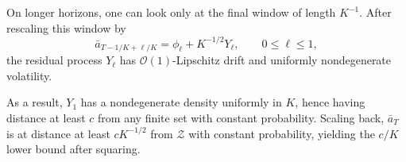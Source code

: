 \documentclass{article}
\newcommand{\1}{\mathbbm{1}}
\numberwithin{equation}{section}
\begin{document}
On longer horizons, one can look only at the final window of length \(K^{-1}\). 
After rescaling this window by
\[
    \bar a_{T-1/K+\ell/K}
    =
    \phi_\ell + K^{-1/2}Y_\ell,
    \qquad 0\le \ell\le 1,
\]
the residual process \(Y_\ell\) has \(\mathcal{O}(1)\)-Lipschitz drift and uniformly nondegenerate volatility.

As a result, \(Y_1\) has a nondegenerate density uniformly in $K$, hence having distance at least $c$ from any finite set with constant probability. Scaling back, \(\bar a_T\) is at distance at
least \(cK^{-1/2}\) from \(\mathcal Z\) with constant probability, yielding
the \(c/K\) lower bound after squaring.
\end{document}

